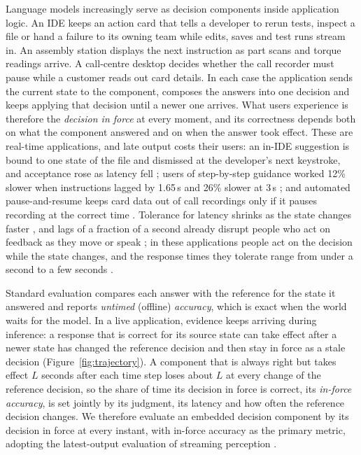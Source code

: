 \documentclass[11pt]{article}
\begin{document}
Language models increasingly serve as decision components inside application logic.
An IDE keeps an action card that tells a developer to rerun tests, inspect a file or hand a failure to its owning team while edits, saves and test runs stream in.
An assembly station displays the next instruction as part scans and torque readings arrive.
A call-centre desktop decides whether the call recorder must pause while a customer reads out card details.
In each case the application sends the current state to the component, composes the answers into one decision and keeps applying that decision until a newer one arrives.
What users experience is therefore the \emph{decision in force} at every moment, and its correctness depends both on what the component answered and on when the answer took effect.
These are real-time applications, and late output costs their users: an in-IDE suggestion is bound to one state of the file and dismissed at the developer's next keystroke, and acceptance rose as latency fell \citep{dunay2024multiline,murali2024ai}; users of step-by-step guidance worked 12\% slower when instructions lagged by 1.65\,s and 26\% slower at 3\,s \citep{olguin2021impact}; and automated pause-and-resume keeps card data out of call recordings only if it pauses recording at the correct time \citep{pcissc2018telephone}.
Tolerance for latency shrinks as the state changes faster \citep{gergle2006impact}, and lags of a fraction of a second already disrupt people who act on feedback as they move or speak \citep{mackenzie1993lag,stuart2002effect}; in these applications people act on the decision while the state changes, and the response times they tolerate range from under a second to a few seconds \citep{murali2024ai,miller1968response,chen2017empirical}.

Standard evaluation compares each answer with the reference for the state it answered and reports \emph{untimed} (offline) \emph{accuracy}, which is exact when the world waits for the model.
In a live application, evidence keeps arriving during inference: a response that is correct for its source state can take effect after a newer state has changed the reference decision and then stay in force as a stale decision (Figure~\ref{fig:trajectory}).
A component that is always right but takes effect $L$ seconds after each time step loses about $L$ at every change of the reference decision, so the share of time its decision in force is correct, its \emph{in-force accuracy}, is set jointly by its judgment, its latency and how often the reference decision changes.
We therefore evaluate an embedded decision component by its decision in force at every instant, with in-force accuracy as the primary metric, adopting the latest-output evaluation of streaming perception \citep{li2020towards}.
\end{document}
